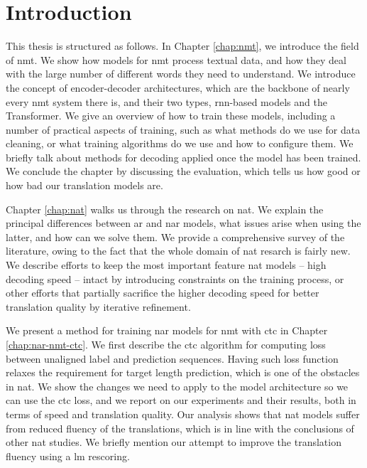 \chapter{Introduction}
\label{chap:intro}


This thesis is structured as follows.
%
In Chapter \ref{chap:nmt}, we introduce the field of \ac{nmt}. We show how
models for \ac{nmt} process textual data, and how they deal with the large
number of different words they need to understand. We introduce the concept of
encoder-decoder architectures, which are the backbone of nearly every \ac{nmt}
system there is, and their two types, \acs{rnn}-based models and the
Transformer. We give an overview of how to train these models, including a
number of practical aspects of training, such as what methods do we use for
data cleaning, or what training algorithms do we use and how to configure
them. We briefly talk about methods for decoding applied once the model has
been trained. We conclude the chapter by discussing the evaluation, which tells
us how good or how bad our translation models are.

Chapter \ref{chap:nat} walks us through the research on \ac{nat}. We explain
the principal differences between \acl{ar} and \acl{nar} models, what issues
arise when using the latter, and how can we solve them. We provide a
comprehensive survey of the literature, owing to the fact that the whole domain
of \ac{nat} resarch is fairly new. We describe efforts to keep the most
important feature \ac{nat} models -- high decoding speed -- intact by
introducing constraints on the training process, or other efforts that
partially sacrifice the higher decoding speed for better translation quality by
iterative refinement. 

We present a method for training \acl{nar} models for \ac{nmt} with \ac{ctc} in
Chapter \ref{chap:nar-nmt-ctc}. We first describe the \ac{ctc} algorithm for
computing loss between unaligned label and prediction sequences. Having such
loss function relaxes the requirement for target length prediction, which is
one of the obstacles in \ac{nat}. We show the changes we need to apply to the
model architecture so we can use the \ac{ctc} loss, and we report on our
experiments and their results, both in terms of speed and translation quality.
Our analysis shows that \ac{nat} models suffer from reduced fluency of the
translations, which is in line with the conclusions of other \ac{nat} studies.
We briefly mention our attempt to improve the translation fluency using a
\acl{lm} rescoring.



